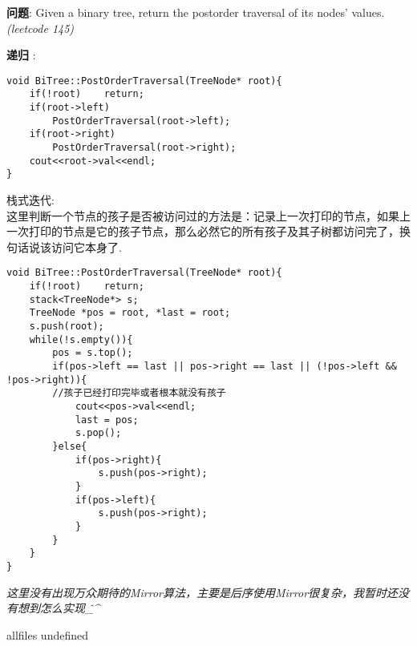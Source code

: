 \documentclass{article}
\begin{document}
\begin{CJK}{UTF8}{gbsn}     %

\else
    
\begin{description}
    \item{\textbf{问题}}: Given a binary tree, return the postorder traversal of its nodes' values. \textit{(leetcode 145)}
    \item{\textbf{递归}} : 
    \\
    \begin{lstlisting}
void BiTree::PostOrderTraversal(TreeNode* root){
    if(!root)    return;
    if(root->left)
        PostOrderTraversal(root->left);
    if(root->right)
        PostOrderTraversal(root->right);
    cout<<root->val<<endl;
}
    \end{lstlisting}
    \item{栈式迭代}: 
    \\这里判断一个节点的孩子是否被访问过的方法是：记录上一次打印的节点，如果上一次打印的节点是它的孩子节点，那么必然它的所有孩子及其子树都访问完了，换句话说该访问它本身了.
    \begin{lstlisting}
void BiTree::PostOrderTraversal(TreeNode* root){
    if(!root)    return;
    stack<TreeNode*> s;
    TreeNode *pos = root, *last = root;
    s.push(root);
    while(!s.empty()){
        pos = s.top();
        if(pos->left == last || pos->right == last || (!pos->left && !pos->right)){
        //孩子已经打印完毕或者根本就没有孩子
            cout<<pos->val<<endl;
            last = pos;
            s.pop();
        }else{
            if(pos->right){
                s.push(pos->right);
            }
            if(pos->left){
                s.push(pos->right);
            }
        }
    }
}
    \end{lstlisting}
    \textit{这里没有出现万众期待的Mirror算法，主要是后序使用Mirror很复杂，我暂时还没有想到怎么实现\^\_\^}
\end{description}

\fi

\ifx allfiles undefined
\end{CJK}
\end{document}
